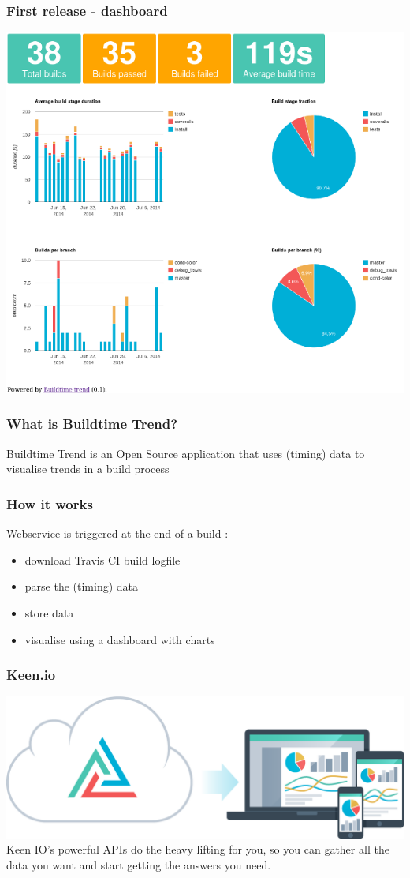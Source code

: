 \documentclass[14pt]{beamer}
\begin{document}
  \begin{frame}
    \frametitle{First release - dashboard}
    \includegraphics[scale=.45]{example_dashboard.png}
  \end{frame}
  \begin{frame}
    \frametitle{What is Buildtime Trend?}
    Buildtime Trend is an Open Source application that uses (timing) data to visualise trends in a build process
  \end{frame}
  \begin{frame}
    \frametitle{How it works}
    Webservice is triggered at the end of a build :
    \begin{itemize}
      \item download Travis CI build logfile
      \item parse the (timing) data
      \item store data
      \item visualise using a dashboard with charts
    \end{itemize}
  \end{frame}
  \begin{frame}
    \frametitle{Keen.io}
    \includegraphics[scale=.20]{keenio_workflow.png}\\
    Keen IO's powerful APIs do the heavy lifting for you, so you can gather all the data you want and start getting the answers you need.
  \end{frame}
\end{document}
